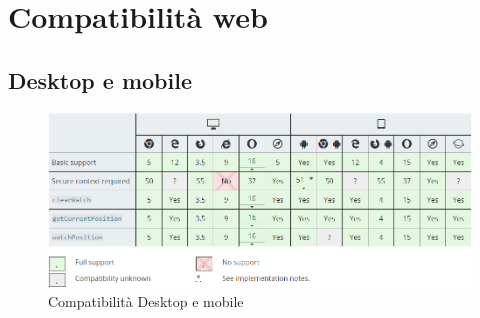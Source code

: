 \documentclass[11pt ,a4paper , twoside , openright ]{book}
\begin{document}
	\section{Compatibilità web}
	\subsection{Desktop e mobile}
	\begin{figure}[h]
		\centering
		\includegraphics[width=1\linewidth]{compatibility}
		\caption{Compatibilità Desktop e mobile}
		\label{fig: Compatibilità Desktop e mobile}
	\end{figure}
\end{document}
